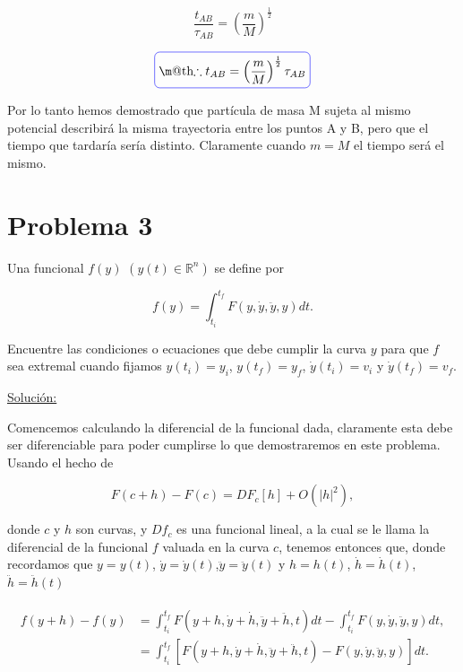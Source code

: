 \documentclass[a4paper,10pt]{article}
\makeatletter
\numberwithin{equation}{section}
\newcommand*{\boxcolor}{blue}
\renewcommand{\boxed}[1]{\textcolor{\boxcolor}{%
\tikz[baseline={([yshift=-1ex]current bounding box.center)}] \node [rectangle, minimum width=1ex,rounded corners,draw] {\normalcolor\m@th$\displaystyle#1$};}}
\makeatother
\begin{document}
\begin{equation}
 \frac{t_{AB}}{\tau_{AB}} = \left(\frac{m}{M}\right)^{\frac{1}{2}}
\end{equation}

\begin{equation}
 \boxed{\therefore t_{AB} = \left(\frac{m}{M}\right)^{\frac{1}{2}}\tau_{AB}}
\end{equation}

Por lo tanto hemos demostrado que  partícula de masa M sujeta al mismo potencial 
describirá la misma trayectoria entre los puntos A y B, pero que el tiempo que tardaría sería distinto. Claramente cuando 
$m = M$ el tiempo será el mismo.





\section{Problema 3}

Una funcional $f(y)$ $(y(t) \in \mathbb{R}^n)$ se define por 

$$
f(y) = \int_{t_{i}}^{t_{f}} F(y,\dot{y},\ddot{y},y)dt.
$$

Encuentre las condiciones o ecuaciones que debe cumplir la curva $y$ para que $f$ sea
extremal cuando fijamos $y(t_i) = y_i$, $y(t_f)=y_f$, $\dot{y}(t_i) = v_i$ y
$\dot{y}(t_f) = v_f$.

\vspace{.3cm}

\underline{Solución:} \vspace{.3cm}

Comencemos calculando la diferencial de la funcional dada, claramente esta debe ser 
diferenciable para poder cumplirse lo que demostraremos en este problema. Usando 
el hecho de 

\begin{equation}
 F(c+h) - F(c) = DF_c[h]+O(|h|^2),
 \label{eq:diferencialFuncional1}
\end{equation}

donde $c$ y $h$ son curvas, y $Df_c$ es una funcional lineal, a la cual se le llama 
la diferencial de la funcional $f$ valuada en la curva $c$, tenemos entonces que, 
donde recordamos que $y = y(t)$, $\dot{y} = \dot{y}(t)$,$\ddot{y} = \ddot{y}(t)$ y $h=h(t)$, 
$\dot{h}=\dot{h}(t)$, $\ddot{h}=\ddot{h}(t)$

\begin{align}
\begin{split}
 f(y+h) - f(y) &= \int_{t_{i}}^{t_{f}} F(y+h,\dot{y}+ \dot{h}, \ddot{y} + \ddot{h}, t)dt -
 \int_{t_{i}}^{t_{f}} F(y,\dot{y},\ddot{y},y)dt, \\
	       &= \int_{t_{i}}^{t_{f}} \left[ F(y+h,\dot{y}+ \dot{h}, \ddot{y} + \ddot{h}, t)
	       -F(y,\dot{y},\ddot{y},y) \right]dt.
 \end{split}
\end{align}
\end{document}
